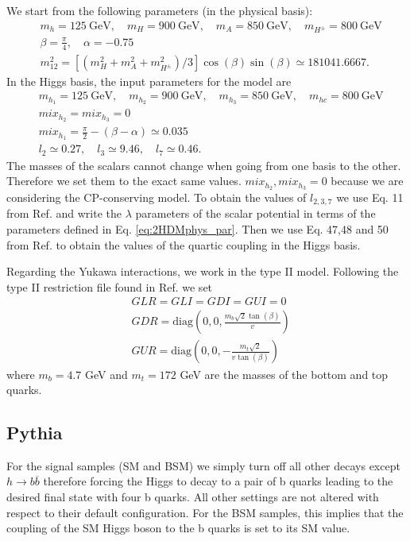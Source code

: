 We start from the following parameters (in the physical basis):
\begin{align}
	&m_h=125 ~\text{GeV}, \quad m_H=900 ~\text{GeV},\quad m_A=850 ~\text{GeV}, \quad m_{H^{\pm}}=800 ~\text{GeV} \nonumber \\
	&\beta=\frac{\pi}{4}, \quad \alpha = -0.75\nonumber \\	 
	&m_{12}^2=[(m_H^2+m_A^2+m_{H^{\pm}}^2)/3] \cos(\beta)\sin(\beta)\simeq181041.6667.
	\label{eq:2HDMphys_par}
\end{align}
In the Higgs basis, the input parameters for the model are
\begin{align}
&m_{h_1}=125 ~\text{GeV}, \quad m_{h_2}=900 ~\text{GeV},\quad m_{h_3}=850 ~\text{GeV}, \quad m_{hc}=800 ~\text{GeV} \nonumber \\
&mix_{h_2}=mix_{h_3} =0 \nonumber \\
&mix_{h_1}=\frac{\pi}{2}-(\beta-\alpha)\simeq 0.035 \nonumber \\
&l_2\simeq 0.27, \quad l_3\simeq 9.46, \quad l_7\simeq 0.46.
\label{eq:2HDMhiggs_par}
\end{align}
The masses of the scalars cannot change when going from one basis to the other. Therefore we set them to the exact same values. $mix_{h_2},mix_{h_3}=0$ because we are considering the CP-conserving model.
To obtain the values of $l_{2,3,7}$ we use Eq. 11 from Ref. \cite{2HDMpedro} and write the $\lambda$ parameters of the scalar potential in terms of the parameters defined in Eq. \ref{eq:2HDMphys_par}. Then we use Eq. 47,48 and 50 from Ref. \cite{2HDMhaber} to obtain the values of the quartic coupling in the Higgs basis.

Regarding the Yukawa interactions, we work in the type II model. Following the type II restriction file found in Ref. \cite{2HDM} we set
\begin{align}
	&GLR=GLI=GDI=GUI=0 \nonumber \\
	&GDR=\text{diag}\left(0,0,\frac{m_b\sqrt{2}\tan(\beta)}{v}\right) \nonumber \\
	&GUR=\text{diag}\left(0,0,-\frac{m_t\sqrt{2}}{v\tan(\beta)}\right)
\end{align}	
where $m_b=4.7$ GeV and $m_t=172$ GeV are the masses of the bottom and top quarks.

\subsection{Pythia}
\label{sec:Pythia_samples}

For the signal samples (SM and BSM) we simply turn off all other decays except $h\rightarrow b\overline{b}$ therefore forcing the Higgs to decay to a pair of b quarks leading to the desired final state with four b quarks. All other settings are not altered with respect to their default configuration. For the BSM samples, this implies that the coupling of the SM Higgs boson to the b quarks is set to its SM value.

